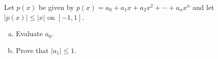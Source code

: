 Let $p(x)$ be given by
$p(x) = a_0 + a_1 x + a_2 x^2 + \cdots + a_n x^n$ and let
$|p(x)| \le |x|$ on $[-1, 1]$.

\begin{enumerate}[(a)]
\item Evaluate $a_0$.
\item Prove that $|a_1| \le 1$.
\end{enumerate}
